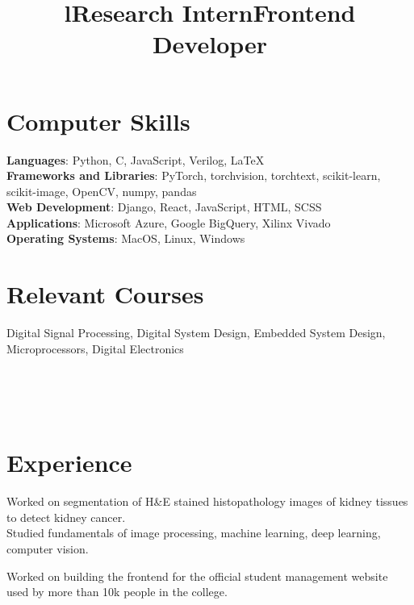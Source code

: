 \documentclass[margin]{res}
\begin{document}
\begin{resume}
    \section{Computer Skills}
      \textbf{Languages}: Python, C, JavaScript, Verilog, \LaTeX
      \\
      \textbf{Frameworks and Libraries}: PyTorch, torchvision, torchtext, scikit-learn, scikit-image, OpenCV, numpy, pandas
      \\
      \textbf{Web Development}: Django, React, JavaScript, HTML, SCSS
      \\
      \textbf{Applications}: Microsoft Azure, Google BigQuery, Xilinx Vivado
      \\
      \textbf{Operating Systems}: MacOS, Linux, Windows

    \section{Relevant Courses}
      Digital Signal Processing, Digital System Design, Embedded System Design,
      Microprocessors, Digital Electronics

    \begin{format}
      \title{l}\\
      \\
      \body\\
    \end{format}

    \section{Experience}
      \title{\textbf{Research Intern}}
      \begin{position}
        Worked on segmentation of H\&E stained histopathology images of kidney tissues to detect kidney cancer.\\
        Studied fundamentals of image processing, machine learning, deep learning, computer vision.
      \end{position}

      \title{\textbf{Frontend Developer}}
      \begin{position}
        Worked on building the frontend for the official student management website used by more than 10k people in the college.
      \end{position}


\end{resume}
\end{document}
